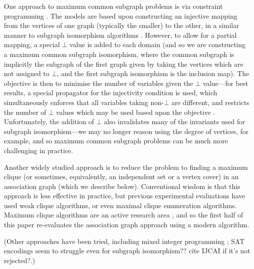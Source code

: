 \documentclass{llncs}
\begin{document}
One approach to maximum common subgraph problems is via constraint programming
\cite{DBLP:conf/mco/VismaraV08,DBLP:conf/cp/NdiayeS11}. The models are based upon constructing an
injective mapping from the vertices of one graph (typically the smaller) to the other, in a similar
manner to subgraph isomorphism algorithms
\cite{DBLP:journals/ai/Solnon10,DBLP:conf/cp/AudemardLMGP14,DBLP:conf/cp/McCreeshP15}. However, to
allow for a partial mapping, a special $\bot$ value is added to each domain (and so we are
constructing a maximum common subgraph isomorphism, where the common subgraph is implicitly the
subgraph of the first graph given by taking the vertices which are not assigned to $\bot$, and the
first subgraph isomorphism is the inclusion map). The objective is then to minimise the number of
variables given the $\bot$ value---for best results, a special propagator for the injectivity
condition is used, which simultaneously enforces that all variables taking non-$\bot$ are different,
and restricts the number of $\bot$ values which may be used based upon the objective
\cite{DBLP:conf/cp/PetitRB01}.  Unfortunately, the addition of $\bot$ also invalidates many of the
invariants used for subgraph isomorphism---we may no longer reason using the degree of vertices, for
example, and so maximum common subgraph problems can be much more challenging in practice.

Another widely studied approach is to reduce the problem to finding a maximum clique (or sometimes,
equivalently, an independent set or a vertex cover) in an association graph (which we describe
below). Conventional wisdom is that this approach is less effective in practice, but previous
experimental evaluations have used weak clique algorithms, or even maximal clique enumeration
algorithms. Maximum clique algorithms are an active research area
\cite{DBLP:conf/dmtcs/TomitaS03,DBLP:journals/jgo/TomitaK07,DBLP:conf/walcom/TomitaSHTW10,DBLP:journals/cor/SegundoRJ11,DBLP:journals/algorithms/Prosser12,DBLP:journals/ol/SegundoMRH13,DBLP:conf/ictai/LiFX13,DBLP:journals/cor/SegundoT14,DBLP:conf/lion/SegundoLB14,DBLP:conf/cp/McCreeshP14,DBLP:journals/jco/BatsynGMP14,DBLP:journals/cor/SegundoNB15,DBLP:conf/lion/NikolaevBS15,DBLP:conf/lion/LiJX15,DBLP:journals/jcc/KoncDTRJ12,DBLP:journals/algorithms/McCreeshP13,DBLP:journals/topc/McCreeshP15,DBLP:journals/cor/SegundoLP16},
and so the first half of this paper re-evaluates the association graph approach using a modern
algorithm.

(Other approaches have been tried, including mixed integer programming
\cite{DBLP:journals/anor/PivaS12}; SAT encodings seem to struggle even for subgraph isomorphism??
cite IJCAI if it's not rejected?.)
\end{document}
